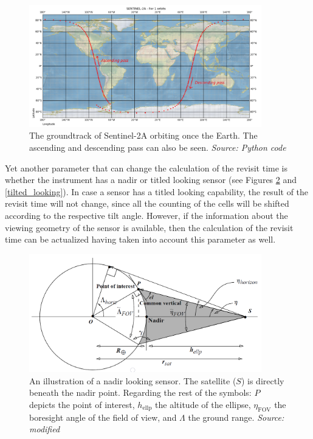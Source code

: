\begin{figure}
\centering
\includegraphics[width=0.9\textwidth]{Images/ascending-descending.png}\caption{The groundtrack of Sentinel-2A orbiting once the Earth. The ascending and descending pass can also be seen. \textit{Source: Python code}}
\label{ascending-descending}
\end{figure}

Yet another parameter that can change the calculation of the revisit time is whether the instrument has a nadir or titled looking sensor (see Figures \ref{nadir_looking} and \ref{tilted_looking}). In case a sensor has a titled looking capability, the result of the revisit time will not change, since all the counting of the cells will be shifted according to the respective tilt angle. However, if the information about the viewing geometry of the sensor is available, then the calculation of the revisit time can be actualized having taken into account this parameter as well.

\begin{figure}
\centering
\includegraphics[width=0.9\textwidth]{Images/nadir_looking.png}\caption{An illustration of a nadir looking sensor. The satellite ($S$) is directly beneath the nadir point. Regarding the rest of the symbols: $P$ depicts the point of interest, $h_{\text{ellp}}$ the altitude of the ellipse, $\eta_{\text{FOV}}$ the boresight angle of the field of view, and $\Lambda$ the ground range. \textit{Source: modified \cite{Vallado}}}
\label{nadir_looking}
\end{figure}

